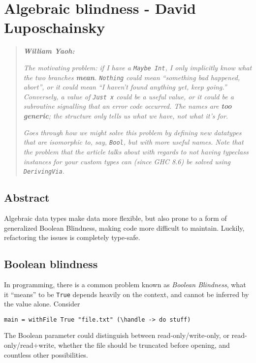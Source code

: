 \chapter{Algebraic blindness - David Luposchainsky}

\begin{quotation}
\noindent\textit{\textbf{William Yaoh:}}

\textit{The motivating problem: if I have a \texttt{Maybe Int}, I only implicitly know what the two branches \textbf{mean}. \texttt{Nothing} could mean ``something bad happened, abort'', or it could mean ``I haven't found anything yet, keep going.'' Conversely, a value of \texttt{Just x} could be a useful value, or it could be a subroutine signalling that an error code occurred. The names are \textbf{too generic}; the structure only tells us what we have, not what it's for.}

\textit{Goes through how we might solve this problem by defining new datatypes that are isomorphic to, say, \texttt{Bool}, but with more useful names. Note that the problem that the article talks about with regards to not having typeclass instances for your custom types can (since GHC 8.6) be solved using \texttt{DerivingVia}.}
\end{quotation}

\section{Abstract}

Algebraic data types make data more flexible, but also prone to a form of generalized Boolean Blindness, making code more difficult to maintain. Luckily, refactoring the issues is completely type-safe.

\section{Boolean blindness}


In programming, there is a common problem known as \textit{Boolean Blindness}, what it ``means'' to be \texttt{True} depends heavily on the context, and cannot be inferred by the value alone. Consider

\begin{verbatim}
main = withFile True "file.txt" (\handle -> do stuff)
\end{verbatim}
The Boolean parameter could distinguish between read-only\-/\-write-only, or read-only\-/\-read+write, whether the file should be truncated before opening, and countless other possibilities.

